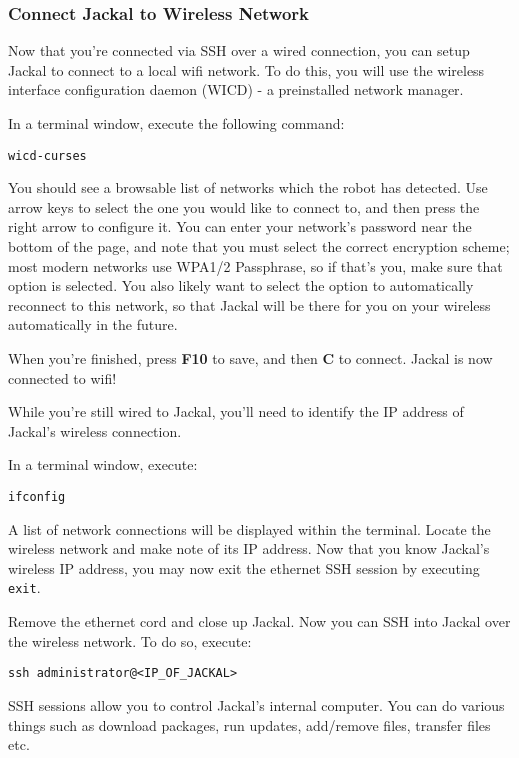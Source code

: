 \documentclass[]{clearpath-latex/clearpath-manual}
\begin{document}
\subsubsection{Connect Jackal to Wireless Network}

Now that you're connected via SSH over a wired connection, you can setup Jackal to connect to a local wifi network.  To do this, you will use the wireless interface configuration daemon (WICD) - a preinstalled network manager.

In a terminal window, execute the following command:

\begin{lstlisting}
wicd-curses
\end{lstlisting}

You should see a browsable list of networks which the robot has detected. Use arrow keys to select the one you would like to connect to, and then press the right arrow to configure it. You can enter your network’s password near the bottom of the page, and note that you must select the correct encryption scheme; most modern networks use WPA1/2 Passphrase, so if that’s you, make sure that option is selected. You also likely want to select the option to automatically reconnect to this network, so that Jackal will be there for you on your wireless automatically in the future.

When you’re finished, press \textbf{F10} to save, and then \textbf{C} to connect.  Jackal is now connected to wifi!

While you're still wired to Jackal, you'll need to identify the IP address of Jackal's wireless connection.

In a terminal window, execute:

\begin{lstlisting}
ifconfig
\end{lstlisting}

A list of network connections will be displayed within the terminal.  Locate the wireless network and make note of its IP address. Now that you know Jackal's wireless IP address, you may now exit the ethernet SSH session by executing \lstinline{exit}.

Remove the ethernet cord and close up Jackal.   Now you can SSH into Jackal over the wireless network.  To do so, execute:

\begin{lstlisting}
ssh administrator@<IP_OF_JACKAL>
\end{lstlisting}

SSH sessions allow you to control Jackal's internal computer.  You can do various things such as download packages, run updates, add/remove files, transfer files etc.
\end{document}
